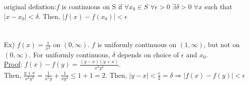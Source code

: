 \documentclass[11pt]{article}
\begin{document}
	original defintion:$f$ is continuous on S if $\forall x_0 \in S$ $\forall
	\epsilon > 0$ $\exists \delta > 0$ $\forall x$ such that $|x - x_0| < 
	\delta$. Then, $|f(x) - f(x_0)| < \epsilon$ \\\\\\
	Ex) $f(x) = \frac{1}{x^2}$ on $(0, \infty)$. $f$ is uniformly continuous
	on $(1, \infty)$, but not on $(0, \infty)$. For uniformly continuous,
	$\delta$ depends on choice of $\epsilon$ and $x_0$.\\
	\underline{Proof}: $f(x) - f(y) = \frac{(y-x)(y+x)}{x^2y^2}$.\\
	Then, $\frac{y+x}{x^2y^2} = \frac{1}{x^2y} + \frac{1}{xy^2} \le 1 + 1 = 2$.
	Then, $|y - x| < \frac{\epsilon}{2} = \delta \Rightarrow |f(x) - f(y)| <
	\epsilon$
\end{document}
